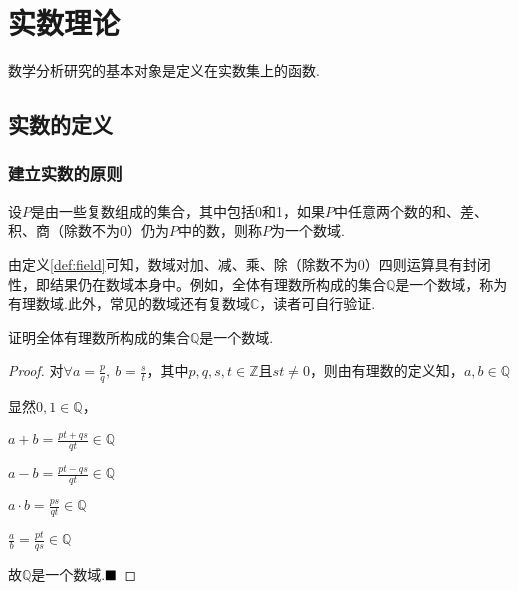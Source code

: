 \chapter{实数理论}

数学分析研究的基本对象是定义在实数集上的函数.
\section{实数的定义}%
\subsection{建立实数的原则}
\begin{definition}[数域]\label{def:field}
	设$P$是由一些复数组成的集合，其中包括0和1，如果$P$中任意两个数的和、差、积、商（除数不为0）仍为$P$中的数，则称$P$为一个{\heiti 数域}.
\end{definition}
由定义\ref{def:field}可知，数域对加、减、乘、除（除数不为0）四则运算具有封闭性，即结果仍在数域本身中。例如，全体有理数所构成的集合$\mathbb{Q}$是一个数域，称为有理数域.此外，常见的数域还有复数域$\mathbb{C}$，读者可自行验证.
\begin{example}
	证明全体有理数所构成的集合$\mathbb{Q}$是一个数域.
	\begin{proof}
		对$\forall a=\frac{p}{q},\ b=\frac{s}{t}$，其中$p,q,s,t\in \mathbb{Z}$且$st\neq0$，则由有理数的定义知，$a,b\in \mathbb{Q}$
		
		显然$0,1\in\mathbb{Q}$，
		
		$a+b=\frac{pt+qs}{qt}\in \mathbb{Q}$
		
		$a-b=\frac{pt-qs}{qt}\in \mathbb{Q}$
		
		$a\cdot b=\frac{ps}{qt}\in \mathbb{Q}$
		
		$\frac{a}{b}=\frac{pt}{qs}\in \mathbb{Q}$
		
		故$\mathbb{Q}$是一个数域.$\hfill\blacksquare$
	\end{proof}
\end{example}
